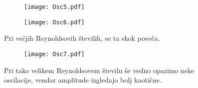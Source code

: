 \documentclass{article}
\begin{document}
\begin{figure}[H]
\centering
\begin{subfigure}{.49\textwidth}
\texttt{[image: Osc5.pdf]}
\end{subfigure}
\begin{subfigure}{.49\textwidth}
\texttt{[image: Osc6.pdf]}
\end{subfigure}
\caption*{Pri večjih Reynoldsovih številih, se ta skok poveča.}
\end{figure}

\begin{figure}[H]
\centering
\begin{subfigure}{.89\textwidth}
\texttt{[image: Osc7.pdf]}
\end{subfigure}
\caption*{Pri tako velikem Reynoldsovem številu še vedno opazimo neke oscilacije, vendar amplitude izgledajo bolj kaotične.}
\end{figure}
\end{document}
